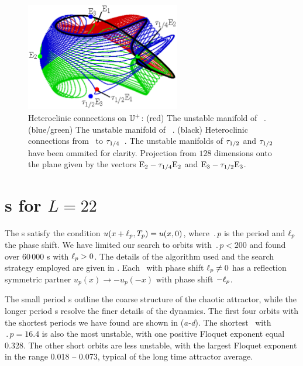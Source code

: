 \begin{figure}[t]
\begin{center}
        \includegraphics[width=0.6\textwidth, clip=true]{figs_bmp/KS22hetero.eps}
\end{center}
\caption{ Heteroclinic connections on $\mathbb{U}^+$:
 (red) The unstable manifold of ~\eqv.
 (blue/green) The unstable manifold of ~\eqv.
 (black) Heteroclinic connections from ~\eqv to $\tau_{1/4}$~\eqv.
 The unstable manifolds of $\tau_{1/2}$ and $\tau_{1/2}$ have been ommited
 for clarity. Projection from $128$ dimensions onto the plane given by the vectors
 $\mathrm{E}_{2}-\tau_{1/4}\mathrm{E}_{2}$ and $\mathrm{E}_{3}-\tau_{1/2}\mathrm{E}_{3}$.}
\label{f:KS22hetero}
\end{figure}



\section{\Rpo s for $L=22$}
\label{sec:rpos}

The \rpo s satisfy the condition 
$u(x+\ell_p,{T_{p}}) = u(x,0)$,
where $\period{p}$ is the period and $\ell_p$ the phase shift.
We have limited our search to orbits with $\period{p} < 200$ and found
over 60\,000 \rpo s with $\ell_p > 0$.  The details of the algorithm
used and the search strategy employed are given in
.
Each \rpo\ with phase shift
$\ell_p \neq 0$ has a reflection symmetric partner
$u_p(x) \to -u_p(-x)$ with phase shift $-\ell_p$.

The small period \rpo s outline the coarse structure of the chaotic
attractor, while the longer period \rpo s resolve the finer details
of the dynamics.
The first four orbits with the shortest periods we have found are
shown in (\textit{a-d}).  The shortest \rpo\ with
$\period{p} = 16.4$ is also the most unstable, with one positive
Floquet exponent equal 0.328.  The other short orbits are less
unstable, with the largest Floquet exponent in the range
0.018 -- 0.073, typical of the long time attractor average.

